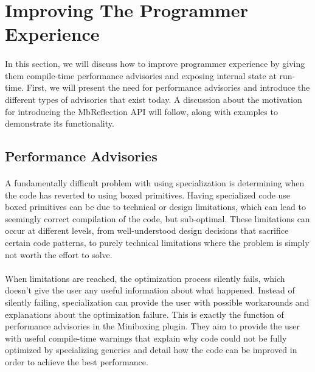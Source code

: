 
\section{Improving The Programmer Experience}
\paragraph{}
In this section, we will discuss how to improve programmer experience by giving them compile-time performance advisories and exposing internal state at run-time. First, we will present the need for performance advisories and introduce the different types of advisories that exist today. A discussion about the motivation for introducing the MbReflection API will follow, along with examples to demonstrate its functionality.
\subsection{Performance Advisories}
\paragraph{}
A fundamentally difficult problem with using specialization is determining when the code has reverted to using boxed primitives. Having specialized code use boxed primitives can be due to technical or design limitations, which can lead to seemingly correct compilation of the code, but sub-optimal. These limitations can occur at different levels, from well-understood design decisions that sacrifice certain code patterns, to purely technical limitations where the problem is simply not worth the effort to solve.
\paragraph{}
When limitations are reached, the optimization process silently fails, which doesn't give the user any useful information about what happened. Instead of silently failing, specialization can provide the user with possible workarounds and explanations about the optimization failure. This is exactly the function of performance advisories in the Miniboxing plugin. They aim to provide the user with useful compile-time warnings that explain why code could not be fully optimized by specializing generics and detail how the code can be improved in order to achieve the best performance.
